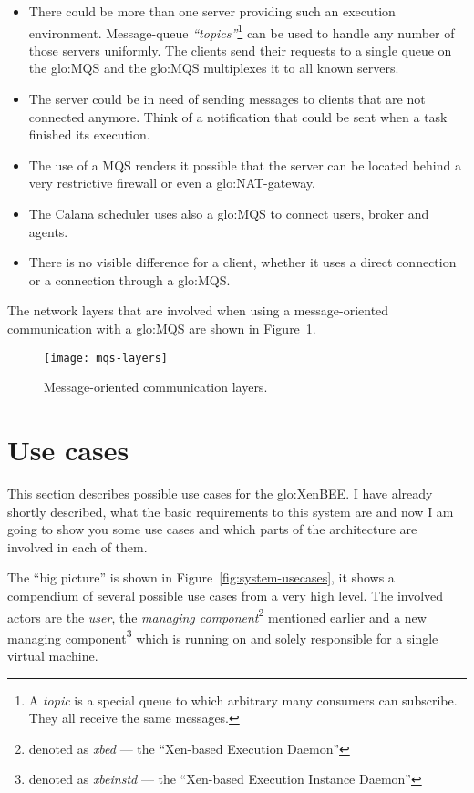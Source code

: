 \begin{itemize}
\item  There could be  more than  one server  providing such  an execution
  environment.  Message-queue \emph{``topics''}\footnote{A \emph{topic} is
    a special queue to which  arbitrary many consumers can subscribe. They
    all receive  the same messages.} can  be used to handle  any number of
  those servers  uniformly. The  clients send their  requests to  a single
  queue on the  \gls{glo:MQS} and the \gls{glo:MQS} multiplexes  it to all
  known servers.
\item The server could be in  need of sending messages to clients that are
  not connected anymore. Think of a notification that could be sent when a
  task finished its execution.
\item The use of a MQS renders  it possible that the server can be located
  behind a very restrictive firewall or even a \gls{glo:NAT}-gateway.
\item The  Calana scheduler  uses also a  \gls{glo:MQS} to  connect users,
  broker and agents.
\item  There is  no visible  difference for  a client,  whether it  uses a
  direct connection or a connection through a \gls{glo:MQS}.
\end{itemize}

The  network  layers  that  are  involved when  using  a  message-oriented
communication      with     a      \gls{glo:MQS}     are      shown     in
Figure~\ref{fig:mqs-layers}.

\begin{figure}[htbp]
  \centering
  \texttt{[image: mqs-layers]}
  \caption[Message Layers]{Message-oriented communication layers.}
  \label{fig:mqs-layers}
\end{figure}

\section{Use cases}
\label{sec:use-cases}

This section describes possible use cases for the \gls{glo:XenBEE}. I have
already shortly described, what the  basic requirements to this system are
and now  I am  going to show  you some  use cases and  which parts  of the
architecture are involved in each of them.

The ``big picture'' is shown in Figure~\ref{fig:system-usecases}, it shows
a compendium  of several possible  use cases from  a very high  level. The
involved    actors    are     the    \emph{user},    the    \emph{managing
  component}\footnote{denoted as \emph{xbed} --- the ``Xen-based Execution
  Daemon''}     mentioned      earlier     and     a      new     managing
component\footnote{denoted   as   \emph{xbeinstd}   ---  the   ``Xen-based
  Execution Instance Daemon''} which  is running on and solely responsible
for a single virtual machine.

